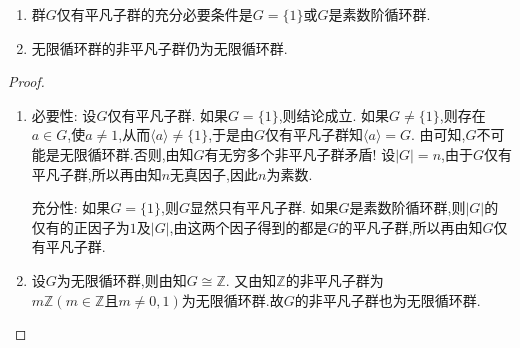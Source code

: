 \documentclass[../../main.tex]{subfiles}%
\begin{document}
\begin{corollary}\label{corollary:群仅有平凡子群的充要条件}
\begin{enumerate}[(1)]
\item\label{corollary:群仅有平凡子群的充要条件-1} 群$G$仅有平凡子群的充分必要条件是$G = \{1\}$或$G$是素数阶循环群.

\item\label{corollary:群仅有平凡子群的充要条件-2} 无限循环群的非平凡子群仍为无限循环群.
\end{enumerate}
\end{corollary}
\begin{proof}
\begin{enumerate}[(1)]
\item {\heiti 必要性:} 设$G$仅有平凡子群. 如果$G = \{1\}$,则结论成立. 如果$G \neq \{1\}$,则存在$a \in G$,使$a\neq 1$,从而$\langle a \rangle \neq \{1\}$,于是由$G$仅有平凡子群知$\langle a \rangle = G$. 由可知,$G$不可能是无限循环群.否则,由知$G$有无穷多个非平凡子群矛盾! 设$|G|=n$,由于$G$仅有平凡子群,所以再由知$n$无真因子,因此$n$为素数.

{\heiti 充分性:} 如果$G = \{1\}$,则$G$显然只有平凡子群. 如果$G$是素数阶循环群,则$|G|$的仅有的正因子为$1$及$|G|$,由这两个因子得到的都是$G$的平凡子群,所以再由知$G$仅有平凡子群.

\item 设$G$为无限循环群,则由知$G\cong \mathbb{Z}.$
又由知$\mathbb{Z}$的非平凡子群为$m\mathbb{Z}(m\in \mathbb{Z}\text{且}m\neq 0,1)$为无限循环群.故$G$的非平凡子群也为无限循环群.
\end{enumerate}

\end{proof}
\end{document}

